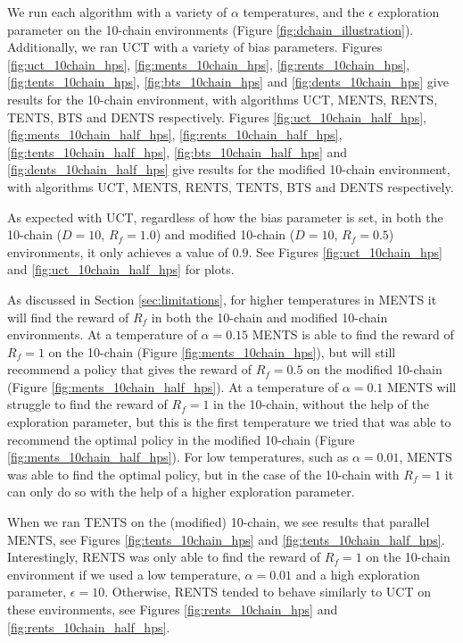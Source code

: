 
    We run each algorithm with a variety of $\alpha$ temperatures, and the $\epsilon$ exploration parameter on the 10-chain environments (Figure \ref{fig:dchain_illustration}). Additionally, we ran UCT with a variety of bias parameters. Figures \ref{fig:uct_10chain_hps}, \ref{fig:ments_10chain_hps}, \ref{fig:rents_10chain_hps}, \ref{fig:tents_10chain_hps}, \ref{fig:bts_10chain_hps} and \ref{fig:dents_10chain_hps} give results for the 10-chain environment, with algorithms UCT, MENTS, RENTS, TENTS, BTS and DENTS respectively. Figures \ref{fig:uct_10chain_half_hps}, \ref{fig:ments_10chain_half_hps}, \ref{fig:rents_10chain_half_hps}, \ref{fig:tents_10chain_half_hps}, \ref{fig:bts_10chain_half_hps} and \ref{fig:dents_10chain_half_hps} give results for the modified 10-chain environment, with algorithms UCT, MENTS, RENTS, TENTS, BTS and DENTS respectively. 

    As expected with UCT, regardless of how the bias parameter is set, in both the 10-chain ($D=10$, $R_f=1.0$) and modified 10-chain ($D=10$, $R_f=0.5$) environments, it only achieves a value of $0.9$. See Figures \ref{fig:uct_10chain_hps} and \ref{fig:uct_10chain_half_hps} for plots.

    As discussed in Section \ref{sec:limitations}, for higher temperatures in MENTS it will find the reward of $R_f$ in both the 10-chain and modified 10-chain environments. At a temperature of $\alpha=0.15$ MENTS is able to find the reward of $R_f=1$ on the 10-chain (Figure \ref{fig:ments_10chain_hps}), but will still recommend a policy that gives the reward of $R_f=0.5$ on the modified 10-chain (Figure \ref{fig:ments_10chain_half_hps}). At a temperature of $\alpha=0.1$ MENTS will struggle to find the reward of $R_f=1$ in the 10-chain, without the help of the exploration parameter, but this is the first temperature we tried that was able to recommend the optimal policy in the modified 10-chain (Figure \ref{fig:ments_10chain_half_hps}). For low temperatures, such as $\alpha=0.01$, MENTS was able to find the optimal policy, but in the case of the 10-chain with $R_f=1$ it can only do so with the help of a higher exploration parameter.

    When we ran TENTS on the (modified) 10-chain, we see results that parallel MENTS, see Figures \ref{fig:tents_10chain_hps} and \ref{fig:tents_10chain_half_hps}. Interestingly, RENTS was only able to find the reward of $R_f=1$ on the 10-chain environment if we used a low temperature, $\alpha=0.01$ and a high exploration parameter, $\epsilon=10$. Otherwise, RENTS tended to behave similarly to UCT on these environments, see Figures \ref{fig:rents_10chain_hps} and \ref{fig:rents_10chain_half_hps}.

